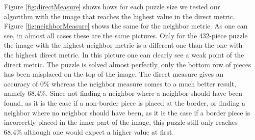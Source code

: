 \documentclass[11pt]{report}
\begin{document}
Figure \ref{fig:directMeasure} shows hows for each puzzle size we tested our
algorithm with the image that reaches the highest value in the direct metric.
Figure \ref{fig:neighborMeasure} shows the same for the neighbor metric. As one
can see, in almost all cases these are the same pictures. Only for the 432-piece
puzzle the image with the highest neighbor metric is a different one than the
one with the highest direct metric. In this picture one can clearly see a weak
point of the direct metric. The puzzle is solved almost perfectly, only the
bottom row of pieces has been misplaced on the top of the image. The direct
measure gives an accuracy of 0\% whereas the neighbor measure comes to a much
better result, namely 68.4\%. Since not finding a neighbor where a neighbor
should have been found, as it is the case if a non-border piece is placed at the
border, or finding a neighbor where no neighbor should have been,
as it is the case if a border piece is incorrectly placed in the inner part of
the image, this puzzle still only reaches 68.4\% although one would expect a
higher value at first.
\end{document}
